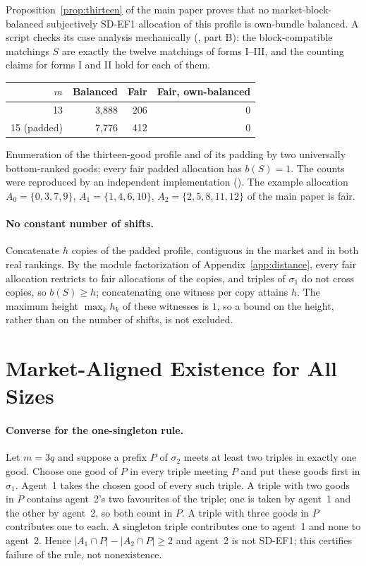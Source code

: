 \documentclass[11pt]{article}
\theoremstyle{definition}
\begin{document}
Proposition~\ref{prop:thirteen} of the main paper proves that no market-block-balanced subjectively SD-EF1 allocation of this profile is own-bundle balanced. A script checks its case analysis mechanically (, part B): the block-compatible matchings $S$ are exactly the twelve matchings of forms I--III, and the counting claims for forms I and II hold for each of them.
\begin{center}\small
\begin{tabular}{@{}rrrr@{}}
\toprule
$m$ & Balanced & Fair & Fair, own-balanced\\ \midrule
13 & 3{,}888 & 206 & 0\\
15 (padded) & 7{,}776 & 412 & 0\\
\bottomrule
\end{tabular}
\end{center}
Enumeration of the thirteen-good profile and of its padding by two universally bottom-ranked goods; every fair padded allocation has $b(S)=1$. The counts were reproduced by an independent implementation (). The example allocation $A_0=\{0,3,7,9\}$, $A_1=\{1,4,6,10\}$, $A_2=\{2,5,8,11,12\}$ of the main paper is fair.

\paragraph{No constant number of shifts.}
Concatenate $h$ copies of the padded profile, contiguous in the market and in both real rankings. By the module factorization of Appendix~\ref{app:distance}, every fair allocation restricts to fair allocations of the copies, and triples of $\sigma_1$ do not cross copies, so $b(S)\ge h$; concatenating one witness per copy attains $h$. The maximum height $\max_kh_k$ of these witnesses is $1$, so a bound on the height, rather than on the number of shifts, is not excluded.

\section{Market-Aligned Existence for All Sizes}\label{app:allsizes}
\paragraph{Converse for the one-singleton rule.}
Let $m=3q$ and suppose a prefix $P$ of $\sigma_2$ meets at least two triples in exactly one good. Choose one good of $P$ in every triple meeting $P$ and put these goods first in $\sigma_1$. Agent~1 takes the chosen good of every such triple. A triple with two goods in $P$ contains agent~2's two favourites of the triple; one is taken by agent~1 and the other by agent~2, so both count in $P$. A triple with three goods in $P$ contributes one to each. A singleton triple contributes one to agent~1 and none to agent~2. Hence $|A_1\cap P|-|A_2\cap P|\ge2$ and agent~2 is not SD-EF1; this certifies failure of the rule, not nonexistence.
\end{document}
